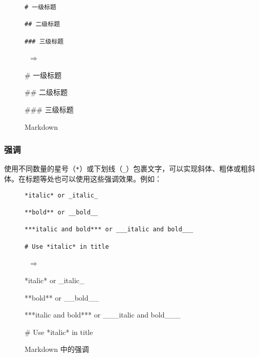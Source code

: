 \documentclass[a4paper,fontset=none]{ctexart}
\begin{document}
\begin{figure}[H]
    \centering
    \begin{minipage}{0.45\textwidth}
        \begin{verbatim}
# 一级标题

## 二级标题

### 三级标题
        \end{verbatim}
    \end{minipage}
    \, $\Longrightarrow$ \,
    \begin{minipage}{0.45\textwidth}
\begin{markdown}
# 一级标题

## 二级标题

### 三级标题
\end{markdown}
    \end{minipage}
    \caption{Markdown}
\end{figure}

\subsubsection{强调}

使用不同数量的星号（\verb|*|）或下划线（\verb|_|）包裹文字，可以实现斜体、粗体或粗斜体。在标题等处也可以使用这些强调效果。例如：

\begin{figure}[H]
    \centering
    \begin{minipage}{0.45\textwidth}
        \begin{verbatim}
*italic* or _italic_

**bold** or __bold__

***italic and bold*** or ___italic and bold___

# Use *italic* in title
        \end{verbatim}
    \end{minipage}
    \, $\Longrightarrow$ \,
    \begin{minipage}{0.45\textwidth}
\begin{markdown}
*italic* or _italic_

**bold** or __bold__

***italic and bold*** or ___italic and bold___

# Use *italic* in title
\end{markdown}
    \end{minipage}
    \caption{Markdown 中的强调}
\end{figure}
\end{document}
